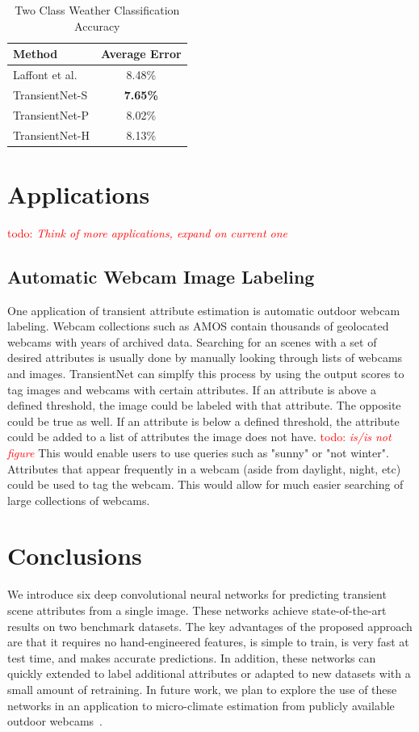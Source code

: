 \documentclass{article}
\newcommand{\todo}[1]{\textcolor{red}{todo: {\em #1}}}
\begin{document}
\begin{table}[t]
	\centering
	\begin{tabular}{ | l | c | }
		\hline
			Method & Average Error \\ \hline
			Laffont et al.~\cite{Laffont14}& 8.48\% \\ \hline
			TransientNet-S & \textbf{7.65\%} \\ \hline
			TransientNet-P & 8.02\% \\ \hline
			TransientNet-H & 8.13\% \\ 
		\hline
	\end{tabular}
	\caption{Two Class Weather Classification Accuracy}
	\label{tbl:transient}
\end{table}

\section{Applications}
\todo{Think of more applications, expand on current one}
\subsection{Automatic Webcam Image Labeling}
\indent

One application of transient attribute estimation is automatic outdoor
webcam labeling. Webcam collections such as AMOS\cite{jacobs07amos} contain
thousands of geolocated webcams with years of archived data.  Searching
for an scenes with a set of desired attributes is usually done by manually
looking through lists of webcams and images.  TransientNet can simplfy this
process by using the output scores to tag images and webcams with certain 
attributes.  If an attribute is above a defined threshold, the image could 
be labeled with that attribute.  The opposite could be true as well.  If an
attribute is below a defined threshold, the attribute could be added to a 
list of attributes the image does not have.  \todo{is/is not figure} This 
would enable users to use queries such as "sunny" or "not winter".  
Attributes that appear frequently in a webcam (aside from daylight, night, etc)
could be used to tag the webcam.  This would allow for much easier searching 
of large collections of webcams.


\section{Conclusions}

We introduce six deep convolutional neural networks for predicting
transient scene attributes from a single image. These networks achieve
state-of-the-art results on two benchmark datasets. The key advantages
of the proposed approach are that it requires no hand-engineered
features, is simple to train, is very fast at test time, and makes
accurate predictions. In addition, these networks can quickly extended
to label additional attributes or adapted to new datasets with a small
amount of retraining. In future work, we plan to explore the use of
these networks in an application to micro-climate estimation from
publicly available outdoor webcams~\cite{islam13webcamweather}. 



\end{document}
